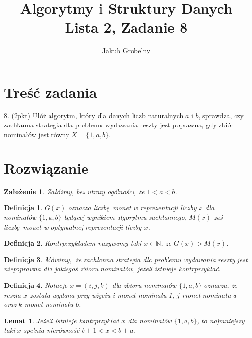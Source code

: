 \documentclass[12pt]{article}
\title{\bfseries Algorytmy i Struktury Danych\\\Large Lista 2, Zadanie 8}
\date{}
\author{\large Jakub Grobelny}
\newtheorem{definition}{Definicja}
\newtheorem*{assumption*}{Założenie}
\newtheorem{lemma}{Lemat}
\begin{document}
\begin{titlepage}
\maketitle
\thispagestyle{empty}

\section{Treść zadania}

8. (2pkt) Ułóż algorytm, który dla danych liczb naturalnych $a$ i $b$, sprawdza,
czy zachłanna strategia dla problemu wydawania reszty jest poprawna, gdy zbiór
nominałów jest równy $X = \{1, a, b\}$.

\section{Rozwiązanie}

\begin{assumption*}
\normalfont
Załóżmy, bez utraty ogólności, że $1 < a < b$.
\end{assumption*}

\begin{definition}
\normalfont
$G(x)$ oznacza liczbę monet w reprezentacji liczby $x$ dla nominałów $\{1, a, b\}$ 
będącej wynikiem algorytmu zachłannego, $M(x)$ zaś liczbę monet w optymalnej
reprezentacji liczby $x$.
\end{definition}

\begin{definition}
\normalfont
Kontrprzykładem nazywamy taki $x \in \mathds{N}$, że $G(x) > M(x)$.
\end{definition}
    
\begin{definition}
\normalfont
Mówimy, że zachłanna strategia dla problemu wydawania reszty jest niepoprawna dla
jakiegoś zbioru nominałów, jeżeli istnieje kontrprzykład.
\end{definition}


\begin{definition}
\normalfont
Notacja $x = (i, j, k)$ dla zbioru nominałów $\{1, a, b\}$ oznacza, że reszta $x$ została wydana przy użyciu $i$
monet nominału 1, $j$ monet nominału $a$ oraz $k$ monet nominału $b$.
\end{definition}

\begin{lemma}\label{lm1}
\normalfont
Jeżeli istnieje kontrprzykład $x$ dla nominałów $\{1, a, b\}$, to najmniejszy
taki $x$ spełnia nierówność $b + 1 < x < b + a$.


\end{lemma}
\end{titlepage}
\end{document}
